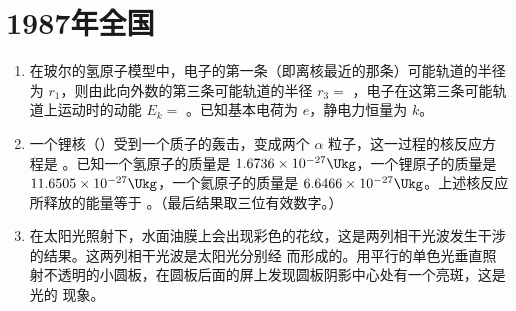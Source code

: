 \documentclass[\gkver]{gaokaozhenti}
\begin{document}
\chapter{1987年全国}

\begin{enumerate}
\item
在玻尔的氢原子模型中，电子的第一条（即离核最近的那条）可能轨道的半径为 $r_{1}$，则由此向外数的第三条可能轨道的半径 $r_{3}=$ ，电子在这第三条可能轨道上运动时的动能 $E_{k}=$ 。已知基本电荷为 $e$，静电力恒量为 $k$。



\item
一个锂核（）受到一个质子的轰击，变成两个 $\alpha$ 粒子，这一过程的核反应方程是 。已知一个氢原子的质量是 $1.6736\times10^{-27}\Ukg$，一个锂原子的质量是 $11.6505\times10^{-27}\Ukg$，一个氦原子的质量是 $6.6466\times10^{-27}\Ukg$。上述核反应所释放的能量等于 。（最后结果取三位有效数字。）



\item
在太阳光照射下，水面油膜上会出现彩色的花纹，这是两列相干光波发生干涉的结果。这两列相干光波是太阳光分别经  而形成的。用平行的单色光垂直照射不透明的小圆板，在圆板后面的屏上发现圆板阴影中心处有一个亮斑，这是光的  现象。


\end{enumerate}
\end{document}
